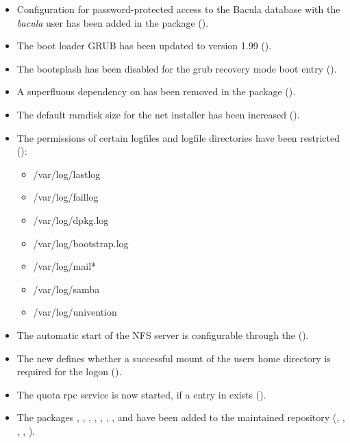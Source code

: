 \begin{itemize}
\item Configuration for password-protected access to the Bacula database
with the \emph{bacula} user has been added in the package
 ().

\item The boot loader GRUB has been updated to version 1.99 ().

\item The bootsplash has been disabled for the grub recovery mode boot
entry ().

\item A superfluous dependency on  has been removed in
  the  package ().

\item The default ramdisk size for the net installer has been increased
().

\item The permissions of certain logfiles and logfile directories have been restricted
():
\begin{itemize}
\item /var/log/lastlog
\item /var/log/faillog
\item /var/log/dpkg.log
\item /var/log/bootstrap.log
\item /var/log/mail*
\item /var/log/samba
\item /var/log/univention
\end{itemize}

\item The automatic start of the NFS server is configurable through the
   ().

\item The new  defines whether a
successful mount of the users home directory is required for the logon
().

\item The quota rpc service is now started, if a entry in
   exists ().

\item The packages ,
, , ,
, , ,
 and  have been
added to the maintained repository (, ,
, , ).


\end{itemize}
